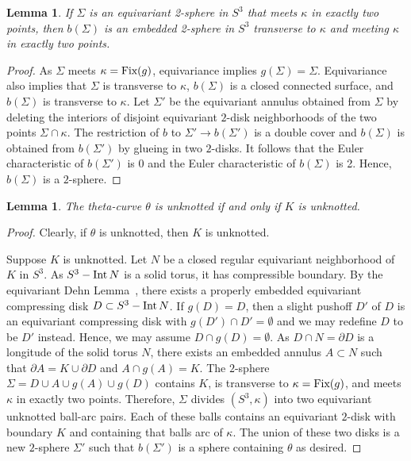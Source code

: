 \documentclass{amsart}
\numberwithin{equation}{section}
\newtheorem{lemma}[theorem]{Lemma}
\theoremstyle{definition}
\newcommand{\pa}[1]{\left(#1\right)}
\newcommand{\tn}[1]{\textnormal{#1}}
\newcommand{\Int}[1]{\tn{Int} \, #1}
\begin{document}
\begin{lemma}\label{lem:sphere}
If $\Sigma$ is an equivariant 2-sphere in $S^3$ that meets $\kappa$ in exactly two points, then $b(\Sigma)$ is an embedded 2-sphere in $S^3$ transverse to $\kappa$ and meeting $\kappa$ in exactly two points.
\end{lemma}
\begin{proof}
As $\Sigma$ meets $\kappa=\tn{Fix}(g)$, equivariance implies $g(\Sigma)=\Sigma$.
Equivariance also implies that $\Sigma$ is transverse to $\kappa$, $b(\Sigma)$ is a closed connected surface, and $b(\Sigma)$ is transverse to $\kappa$.
Let $\Sigma'$ be the equivariant annulus obtained from $\Sigma$ by deleting the interiors of disjoint equivariant $2$-disk neighborhoods of the two points $\Sigma\cap\kappa$.
The restriction of $b$ to $\Sigma'\to b(\Sigma')$ is a double cover and $b(\Sigma)$ is obtained from $b(\Sigma')$ by glueing in two $2$-disks. It follows that the Euler characteristic of $b(\Sigma')$ is 0 and the Euler characteristic of $b(\Sigma)$ is 2. 
Hence, $b(\Sigma)$ is a $2$-sphere.
\end{proof}

\begin{lemma}\label{lem:unknotted}
The theta-curve $\theta$ is unknotted if and only if $K$ is unknotted.
\end{lemma}
\begin{proof}
Clearly, if $\theta$ is unknotted, then $K$ is unknotted.

Suppose $K$ is unknotted.
Let $N$ be a closed regular equivariant neighborhood of $K$ in $S^3$.
As $S^3-\Int N$ is a solid torus, it has compressible boundary.
By the equivariant Dehn Lemma~\cite[Lemma~3]{KT80}, there exists a properly embedded equivariant compressing disk $D\subset S^3-\Int N$.
If $g(D)=D$, then a slight pushoff $D'$ of $D$ is an equivariant compressing disk with $g(D')\cap D'=\emptyset$ and we may redefine $D$ to be $D'$ instead.
Hence, we may assume $D\cap g(D)=\emptyset$.
As $D\cap N=\partial D$ is a longitude of the solid torus $N$, there exists an embedded annulus $A\subset N$ such that $\partial A=K\cup\partial D$ and $A\cap g(A)=K$.
The $2$-sphere $\Sigma=D\cup A\cup g(A)\cup g(D)$ contains $K$, is transverse to $\kappa=\tn{Fix}(g)$, and meets $\kappa$ in exactly two points.
Therefore, $\Sigma$ divides $\pa{S^3,\kappa}$ into two equivariant unknotted ball-arc pairs.
Each of these balls contains an equivariant $2$-disk with boundary $K$ and containing that balls arc of $\kappa$.
The union of these two disks is a new $2$-sphere $\Sigma'$ such that $b(\Sigma')$ is a sphere containing $\theta$ as desired.
\end{proof}
\end{document}
